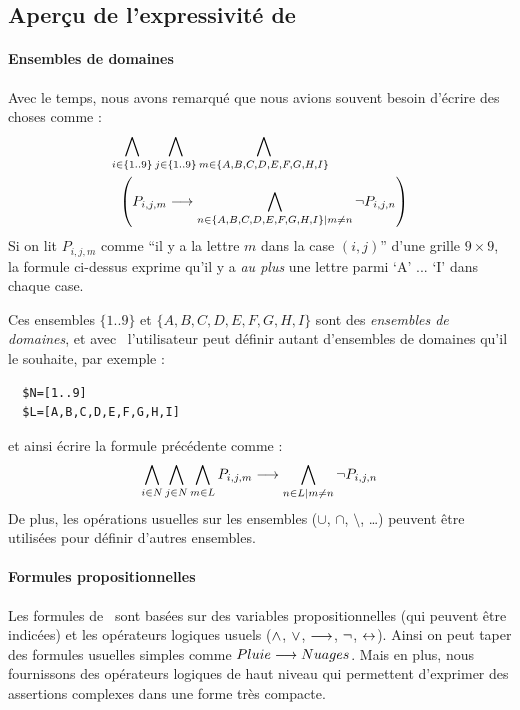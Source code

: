 \subsection{Aperçu de l'expressivité de \nameTool\label{sec:sat_tobedone}}

\paragraph{Ensembles de domaines}
Avec le temps, nous avons remarqué que nous avions souvent besoin d'écrire des choses comme :
$$\begin{aligned}\bigwedge_{i \in \{1..9\}} \bigwedge_{j \in \{1..9\}}\bigwedge_{ m\in \{A,B,C,D,E,F,G,H,I\}} \hspace{2cm}\\ \left( P_{i,j,m}\longrightarrow \bigwedge_{n \in \{A,B,C,D,E,F,G,H,I\}|m\neq n}\neg P_{i,j,n}\right)\end{aligned}$$
Si on lit $P_{i,j,m}$ comme  ``il y a la lettre $m$ dans la case $(i,j)$'' d'une grille $9\times 9$, la formule ci-dessus exprime qu'il y a \emph{au plus} une lettre parmi `A' ... `I' dans chaque case. 

Ces ensembles $\{1..9\}$ et $\{A,B,C,D,E,F,G,H,I\}$ sont des \emph{ensembles de domaines}, et avec \nameTool\ l'utilisateur peut définir autant d'ensembles de domaines qu'il le souhaite, par exemple :

\begin{verbatim}
  $N=[1..9]
  $L=[A,B,C,D,E,F,G,H,I]
\end{verbatim}

et ainsi écrire la formule précédente comme :
$$\bigwedge_{i \in N} \bigwedge_{j \in N}\bigwedge_{ m\in L}P_{i,j,m}\longrightarrow \bigwedge_{n \in L|m\neq n}\neg P_{i,j,n}$$
De plus, les opérations usuelles sur les ensembles ($\cup$, $\cap$, $\setminus$, \ldots) peuvent être utilisées pour définir d'autres ensembles.


\paragraph{Formules propositionnelles}

Les formules de \nameTool\ sont basées sur des variables propositionnelles (qui peuvent être indicées) et les opérateurs logiques usuels ($\wedge$, $\vee$, $\longrightarrow$, $\neg$, $\leftrightarrow$). Ainsi on peut taper des formules usuelles simples comme $Pluie \longrightarrow Nuages$. Mais en plus, nous fournissons des opérateurs logiques de haut niveau qui permettent d'exprimer des assertions complexes dans une forme très compacte.

